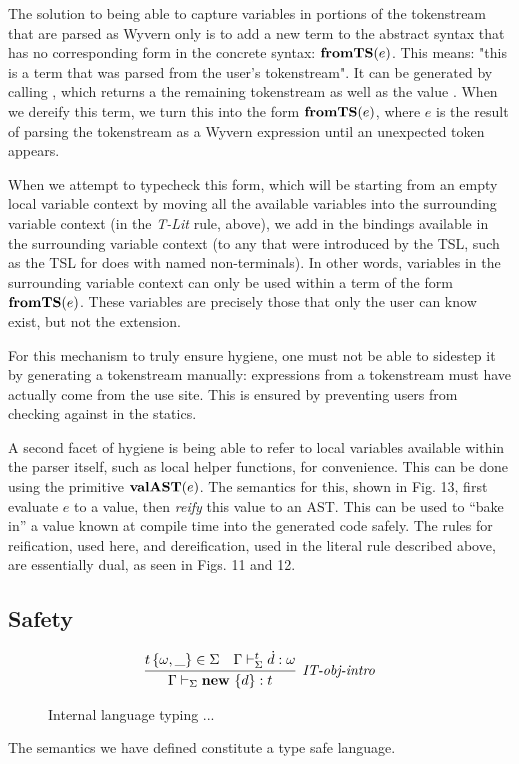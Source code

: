The solution to being able to capture variables in portions of the tokenstream that are parsed as Wyvern only is to add a new term to the abstract syntax that has no corresponding form in the concrete syntax: $\textbf{fromTS}(e)$. This means: "this is a term that was parsed from the user's tokenstream". It can be generated by calling , which returns a the remaining tokenstream as well as the value  . When we dereify this term, we turn this into the form $\textbf{fromTS}(e)$, where $e$ is the result of parsing the tokenstream as a Wyvern expression until an unexpected token  appears.

When we attempt to typecheck this form, which will be starting from an empty local variable context by moving all the available variables into the surrounding variable context (in the \textit{T-Lit} rule, above), we add in the bindings available in the surrounding variable context (to any that were introduced by the TSL, such as the TSL for  does with named non-terminals). In other words, variables in the surrounding variable context can only be used within a term of the form $\textbf{fromTS}(e)$. These variables are precisely those that only the user can know exist, but not the extension.

For this mechanism to truly ensure hygiene, one must not be able to sidestep it by generating a tokenstream manually: expressions from a tokenstream must have actually come from the use site. This is ensured by preventing users from checking  against  in the statics.

A second facet of hygiene is being able to refer to local variables available within the parser itself, such as local helper functions, for convenience. This can be done using the primitive $\textbf{valAST}(e)$. The semantics for this, shown in Fig. 13, first evaluate $e$ to a value, then \emph{reify} this value to an AST. This can be used to ``bake in'' a value known at compile time into the generated code safely. The rules for reification, used here, and dereification, used in the literal rule described above, are essentially dual, as seen in Figs. 11 and 12.

\subsection{Safety}
\begin{figure}
\[
\begin{array}{c}
\infer[\textit{IT-obj-intro}]
	{\Gamma \vdash_\Sigma \keyw{new}~\{d\} : t}
	{t\,\{\omega, \_\} \in \Sigma & 
	 \Gamma \vdash_\Sigma^t \dot{d} : \omega}
\end{array}
\]
\caption{Internal language typing ...}
\label{it-statics}
\end{figure}
The semantics we have defined constitute a type safe language.

